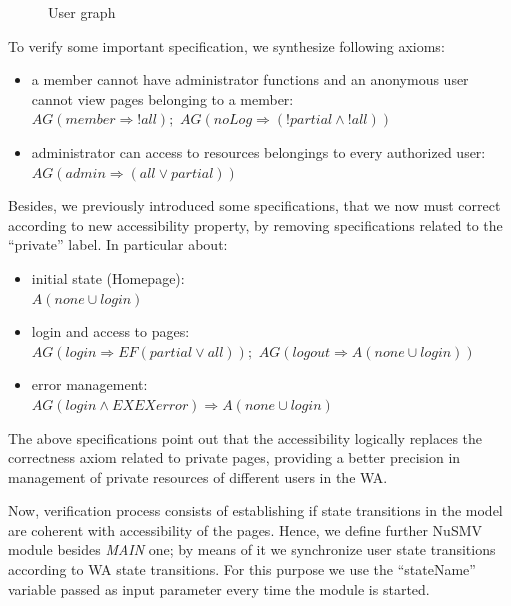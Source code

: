 \begin{figure}[ht]
\centerline{}
\caption{User graph \label{fig5}}
\end{figure}

To verify some important specification, we synthesize following axioms:  

\footnotesize
\begin{itemize}
	\item a member cannot have administrator functions and an anonymous user cannot view pages belonging to a member:\\  
       $AG(member \Rightarrow !all );$     $AG(noLog \Rightarrow (!partial \wedge !all))$
	\item administrator can access to resources belongings to every authorized user:\\
       $AG( admin \Rightarrow (all \vee partial))$
\end{itemize}      

\normalsize
Besides, we previously introduced some \ctl specifications, that we now must correct according to new accessibility property, by removing specifications related to the ``private'' label. In particular about:

\footnotesize
\begin{itemize}
	\item initial state (Homepage):\\
			$A( none  \cup  login )$
	\item login and access to pages:\\ 
      $AG( login \Rightarrow  EF(partial \vee all) );$      $AG( logout \Rightarrow  A(none \cup  login))$
	\item error management:\\
			$AG (login \wedge EX EX error) \Rightarrow  A(none \cup  login )$
\end{itemize}

\normalsize
The above specifications point out that the accessibility logically replaces the correctness axiom related to private pages, providing a better precision in management of private resources of different users in the WA.

Now, verification process consists of establishing if state transitions in the model are coherent with accessibility of the pages. Hence, we define further NuSMV module besides \textit{MAIN} one; by means of it we synchronize user state transitions according to WA state transitions. For this purpose we use the ``stateName'' variable passed as input parameter every time the module is started. 
